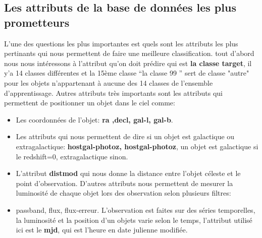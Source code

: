\subsection{Les attributs de la base de données les plus prometteurs}
L’une des questions les plus importantes est quels sont les attributs les plus pertinants qui nous permettent de faire une meilleure classification. 
tout d’abord nous nous intéressons à l’attribut qu’on doit prédire qui est \textbf{la classe target}, il y’a 14 classes différentes et la 15ème classe “la classe 99 ”  sert de classe "autre" pour les objets n'appartenant à aucune des 14 classes de l'ensemble d'apprentissage.
\newline
\newline
Autres attributs très importants sont les attributs qui permettent de positionner un objet dans le ciel comme:
\begin{itemize}
    \item Les coordonnées de l'objet: \textbf{ra ,decl, gal-l, gal-b}.
    \item Les attributs qui nous permettent de dire si un objet est galactique ou extragalactique:  \textbf{hostgal-photoz, hostgal-photoz}, un objet est galactique si le redshift=0, extragalactique sinon.
    \item L'attribut \textbf{distmod} qui nous donne la distance entre l'objet céleste et le point d'observation.
\newline
\newline
D'autres attributs nous permettent de mesurer la luminosité de chaque objet lors des observation selon plusieurs filtres:
    \item passband, flux, flux-erreur.
\newline
L'observation est faites sur des séries temporelles,  la luminosité et la position d'un objets varie selon le temps, l'attribut utilisé ici est le \textbf{mjd}, qui est l'heure en date julienne modifiée.
\end{itemize}

